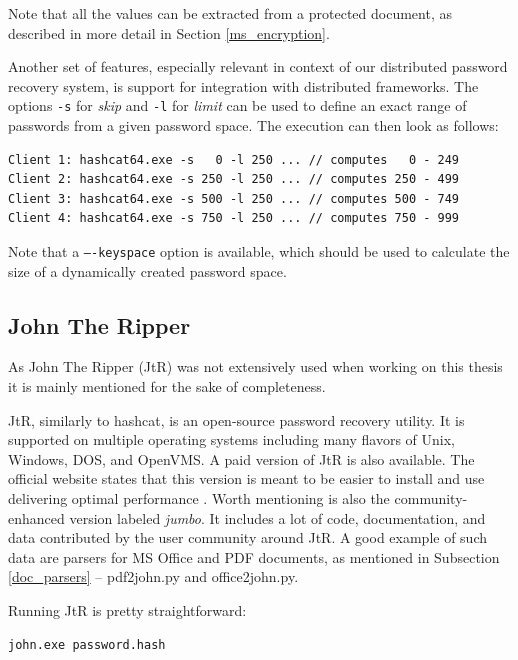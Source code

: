 \documentclass[11pt,oneside]{fithesis2}
\begin{document}
Note that all the values can be extracted from a protected document, as described in more detail in Section \ref{ms_encryption}.

Another set of features, especially relevant in context of our distributed password recovery system, is support for integration with distributed frameworks. The options \texttt{-s} for \textit{skip} and \texttt{-l} for \textit{limit} can be used to define an exact range of passwords from a given password space. The execution can then look as follows:

\begin{lstlisting}
Client 1: hashcat64.exe -s   0 -l 250 ... // computes   0 - 249
Client 2: hashcat64.exe -s 250 -l 250 ... // computes 250 - 499
Client 3: hashcat64.exe -s 500 -l 250 ... // computes 500 - 749
Client 4: hashcat64.exe -s 750 -l 250 ... // computes 750 - 999
\end{lstlisting}

Note that a \texttt{----keyspace} option is available, which should be used to calculate the size of a dynamically created password space. 

\subsection{John The Ripper}

As John The Ripper (JtR) was not extensively used when working on this thesis it is mainly mentioned for the sake of completeness.

JtR, similarly to hashcat, is an open-source password recovery utility. It is supported on multiple operating systems including many flavors of Unix, Windows, DOS, and OpenVMS. A paid version of JtR is also available. The official website states that this version is meant to be easier to install and use delivering optimal performance \cite{jtr}. Worth mentioning is also the community-enhanced version labeled \textit{jumbo}. It includes a lot of code, documentation, and data contributed by the user community around JtR. A good example of such data are parsers for MS Office and PDF documents, as mentioned in Subsection \ref{doc_parsers} -- pdf2john.py and  office2john.py.

Running JtR is pretty straightforward:

\begin{lstlisting}
john.exe password.hash
\end{lstlisting}
\end{document}
